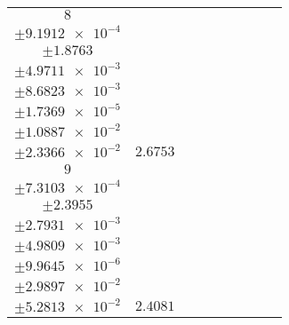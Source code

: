 \documentclass[8pt]{article}
\begin{document}
\begin{longtable}[l]{c c c c c c c c c}
$\num{8}$ & \begin{tabular}[c]{@{}c@{}}$\num{3.2144e-2}$ \\ $\pm\num{9.1912e-4}$\end{tabular} & \begin{tabular}[c]{@{}c@{}}$\num{6.9644e-2}$ \\ $\pm\num{1.8763}$\end{tabular} & \begin{tabular}[c]{@{}c@{}}$\num{-7.0885}$ \\ $\pm\num{4.9711e-3}$\end{tabular} & \begin{tabular}[c]{@{}c@{}}$\num{1.4312e+3}$ \\ $\pm\num{8.6823e-3}$\end{tabular} & \begin{tabular}[c]{@{}c@{}}$\num{2.8631}$ \\ $\pm\num{1.7369e-5}$\end{tabular} & \begin{tabular}[c]{@{}c@{}}$\num{1.2218}$ \\ $\pm\num{1.0887e-2}$\end{tabular} & \begin{tabular}[c]{@{}c@{}}$\num{4.1666}$ \\ $\pm\num{2.3366e-2}$\end{tabular} & $\num{2.6753}$\\
$\num{9}$ & \begin{tabular}[c]{@{}c@{}}$\num{2.7601e-2}$ \\ $\pm\num{7.3103e-4}$\end{tabular} & \begin{tabular}[c]{@{}c@{}}$\num{3.5212e-2}$ \\ $\pm\num{2.3955}$\end{tabular} & \begin{tabular}[c]{@{}c@{}}$\num{-6.8021}$ \\ $\pm\num{2.7931e-3}$\end{tabular} & \begin{tabular}[c]{@{}c@{}}$\num{1.4316e+3}$ \\ $\pm\num{4.9809e-3}$\end{tabular} & \begin{tabular}[c]{@{}c@{}}$\num{2.864}$ \\ $\pm\num{9.9645e-6}$\end{tabular} & \begin{tabular}[c]{@{}c@{}}$\num{1.1314}$ \\ $\pm\num{2.9897e-2}$\end{tabular} & \begin{tabular}[c]{@{}c@{}}$\num{4.0527}$ \\ $\pm\num{5.2813e-2}$\end{tabular} & $\num{2.4081}$\\

\end{longtable}
\end{document}
